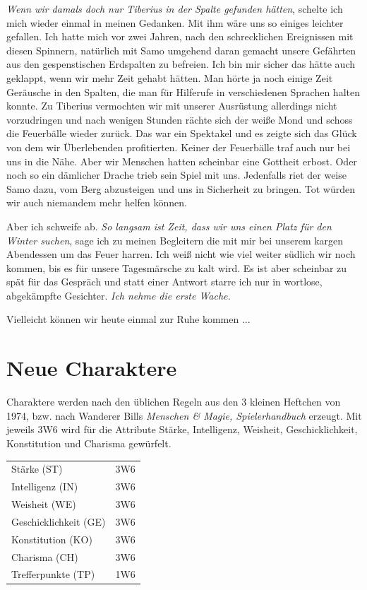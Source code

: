 \documentclass[11pt]{wbzine}
\begin{document}
\begin{multicols}{2}
\textit{Wenn wir damals doch nur Tiberius in der Spalte gefunden
hätten}, schelte ich mich wieder einmal in meinen Gedanken. Mit ihm
wäre uns so einiges leichter gefallen. Ich hatte mich vor zwei
Jahren, nach den schrecklichen Ereignissen mit diesen Spinnern,
natürlich mit Samo umgehend daran gemacht unsere Gefährten
aus den gespenstischen Erdspalten zu befreien. Ich bin mir sicher
das hätte auch geklappt, wenn wir mehr Zeit gehabt hätten. Man hörte
ja noch einige Zeit Geräusche in den Spalten, die man für Hilferufe
in verschiedenen Sprachen halten konnte. Zu Tiberius vermochten wir 
mit unserer Ausrüstung allerdings nicht vorzudringen und 
nach wenigen Stunden rächte sich der weiße Mond und schoss die
Feuerbälle wieder zurück. Das war ein Spektakel und es zeigte sich
das Glück von dem wir Überlebenden profitierten. Keiner der
Feuerbälle traf auch nur bei uns in die Nähe. Aber wir Menschen
hatten scheinbar eine Gottheit erbost. Oder noch so ein dämlicher
Drache trieb sein Spiel mit uns. Jedenfalls riet der weise Samo
dazu, vom Berg abzusteigen und uns in Sicherheit zu bringen. 
Tot würden wir auch niemandem mehr helfen können.


Aber ich schweife ab. \textit{So langsam ist Zeit, dass wir uns einen
Platz für den Winter suchen}, sage ich zu meinen Begleitern die mit
mir bei unserem kargen Abendessen um das Feuer harren. Ich weiß
nicht wie viel weiter südlich wir noch kommen, bis es für unsere
Tagesmärsche zu kalt wird. Es ist aber scheinbar zu spät für das
Gespräch und statt einer Antwort starre ich nur in wortlose,
abgekämpfte Gesichter. \textit{Ich nehme die erste Wache.} 

Vielleicht können wir heute einmal zur Ruhe kommen ...


\section{Neue Charaktere}

Charaktere werden nach den üblichen Regeln aus den 3 kleinen
Heftchen von 1974, bzw. nach Wanderer Bills \textit{Menschen \&
Magie, Spielerhandbuch} erzeugt. Mit jeweils 3W6 wird für die
Attribute Stärke, Intelligenz, Weisheit, Geschicklichkeit,
Konstitution und Charisma gewürfelt.

\begin{tabularx}{\columnwidth}{Zc}
    Stärke (ST) & 3W6 \\
    Intelligenz (IN) & 3W6 \\
    Weisheit (WE) & 3W6 \\
    Geschicklichkeit (GE) & 3W6 \\
    Konstitution (KO) & 3W6 \\
    Charisma (CH) & 3W6 \\
    Trefferpunkte (TP) & 1W6 \\
\end{tabularx}


\end{multicols}
\end{document}
